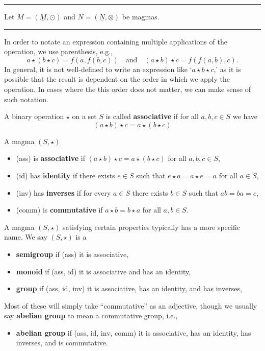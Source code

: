 \documentclass[12pt]{article}
\newcommand{\keyword}[1]{\textbf{#1}}
\newcommand{\sepline}{\rule{\textwidth}{0.4pt}}
\theoremstyle{definition}
\newcommand{\isp}[1]{\quad\text{#1}\quad}
\newcommand{\<}{\left\langle}
\renewcommand{\>}{\right\rangle}
\newcommand{\udl}{\underline}
\begin{document}
\sepline

Let $M = (\udl{M}, \odot)$ and $N = (\udl{N}, \otimes)$ be magmas.

\sepline

In order to notate an expression containing multiple applications of the operation, we use parenthesis, e.g.,
\[
    a \star (b \star c) = f(a, f(b, c)) \isp{and} (a \star b) \star c = f(f(a, b), c).
\]
In general, it is not well-defined to write an expression like `$a \star b \star c$,' as it is possible that the result is dependent on the order in which we apply the operation.
In cases where the this order does not matter, we can make sense of such notation.

A binary operation $\star$ on a set $S$ is called \keyword{associative} if
for all $a, b, c \in S$ we have
\[
    (a \star b) \star c = a \star (b \star c)
\]

A magma $(S, \star)$
\begin{itemize}
    \item (ass) is \keyword{associative} if $(a \star b) \star c = a \star (b \star c)$ for all $a, b, c \in S$,
    \item (id) has \keyword{identity} if there exists $e \in S$ such that $e \star a = a \star e = a$ for all $a \in S$,
    \item (inv) has \keyword{inverses} if for every $a \in S$ there exists $b \in S$ such that $ab = ba = e$,
    \item (comm) is \keyword{commutative} if $a \star b = b \star a$ for all $a, b \in S$.
\end{itemize}

A magma $(S, \star)$ satisfying certain properties typically has a more specific name.
We say $(S, \star)$ is a
\begin{itemize}
    \item \keyword{semigroup} if (ass) it is associative,
    \item \keyword{monoid} if (ass, id) it is associative and has an identity,
    \item \keyword{group} if (ass, id, inv) it is associative, has an identity, and has inverses,
\end{itemize}
Most of these will simply take ``commutative'' as an adjective, though we usually say \keyword{abelian group} to mean a commutative group, i.e.,
\begin{itemize}
    \item \keyword{abelian group} if (ass, id, inv, comm) it is associative, has an identity, has inverses, and is commutative.
\end{itemize}
\end{document}
